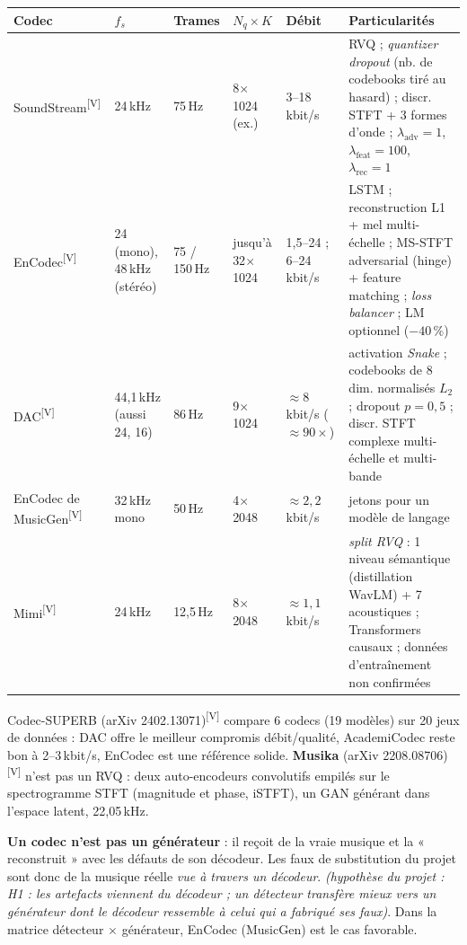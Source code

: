 \documentclass[10pt,a4paper]{article}
\newcommand{\sV}{\textsuperscript{\scriptsize\textcolor{green!40!black}{[V]}}}
\newcommand{\hyp}[1]{\textit{(hypothèse du projet : #1)}}
\begin{document}
\begin{center}\footnotesize
\begin{tabularx}{\textwidth}{@{}L{2.2cm}L{1.5cm}L{1.5cm}L{2.2cm}L{1.9cm}X@{}}
\toprule
\textbf{Codec} & $f_s$ & \textbf{Trames} & $N_q\times K$ & \textbf{Débit} & \textbf{Particularités}\\
\midrule
SoundStream\sV & 24\,kHz & 75\,Hz & 8$\times$1024 (ex.) & 3--18\,kbit/s & RVQ ; \emph{quantizer dropout} (nb. de codebooks tiré au hasard) ; discr. STFT + 3 formes d'onde ; $\lambda_{\mathrm{adv}}{=}1$, $\lambda_{\mathrm{feat}}{=}100$, $\lambda_{\mathrm{rec}}{=}1$\\
EnCodec\sV & 24 (mono), 48\,kHz (stéréo) & 75 / 150\,Hz & jusqu'à 32$\times$1024 & 1,5--24 ; 6--24\,kbit/s & LSTM ; reconstruction L1 + mel multi-échelle ; MS-STFT adversarial (hinge) + feature matching ; \emph{loss balancer} ; LM optionnel ($-40$\,\%)\\
DAC\sV & 44,1\,kHz (aussi 24, 16) & 86\,Hz & 9$\times$1024 & $\ensuremath{\approx}8$\,kbit/s ($\ensuremath{\approx}90\times$) & activation \emph{Snake} ; codebooks de 8 dim. normalisés $L_2$ ; dropout $p=0{,}5$ ; discr. STFT complexe multi-échelle et multi-bande\\
EnCodec de MusicGen\sV & 32\,kHz mono & 50\,Hz & 4$\times$2048 & $\ensuremath{\approx}2{,}2$\,kbit/s & jetons pour un modèle de langage\\
Mimi\sV & 24\,kHz & 12,5\,Hz & 8$\times$2048 & $\ensuremath{\approx}1{,}1$\,kbit/s & \emph{split RVQ} : 1 niveau sémantique (distillation WavLM) + 7 acoustiques ; Transformers causaux ; données d'entraînement non confirmées\\
\bottomrule
\end{tabularx}
\end{center}
Codec-SUPERB (arXiv 2402.13071)\sV{} compare 6 codecs (19 modèles) sur 20 jeux de données : DAC offre le meilleur compromis débit/qualité, AcademiCodec reste bon à 2--3\,kbit/s, EnCodec est une référence solide. \textbf{Musika} (arXiv 2208.08706)\sV{} n'est pas un RVQ : deux auto-encodeurs convolutifs empilés sur le spectrogramme STFT (magnitude et phase, iSTFT), un GAN générant dans l'espace latent, 22,05\,kHz.

\begin{projet}
\textbf{Un codec n'est pas un générateur} : il reçoit de la vraie musique et la « reconstruit » avec les défauts de son décodeur. Les faux de substitution du projet sont donc de la musique réelle \emph{vue à travers un décodeur}. \hyp{H1 : les artefacts viennent du décodeur ; un détecteur transfère mieux vers un générateur dont le décodeur ressemble à celui qui a fabriqué ses faux}. Dans la matrice détecteur $\times$ générateur, EnCodec (MusicGen) est le cas favorable.
\end{projet}
\end{document}
